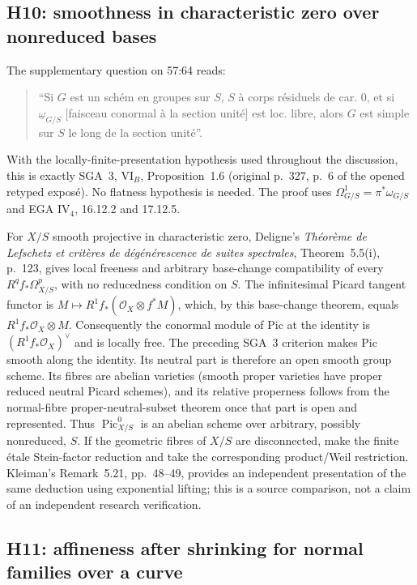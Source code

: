 \subsection{H10: smoothness in characteristic zero over nonreduced bases}

The supplementary question on 57:64 reads:
\begin{quote}
``Si $G$ est un sch\'em en groupes sur $S$, $S$ \`a corps r\'esiduels de car.
$0$, et si $\underline\omega_{G/S}$ [faisceau conormal \`a la section unit\'e]
est loc. libre, alors $G$ est simple sur $S$ le long de la section unit\'e''.
\end{quote}
With the locally-finite-presentation hypothesis used throughout the discussion,
this is exactly SGA~3, VI$_B$, Proposition~1.6 (original p.~327, p.~6 of the
opened retyped expos\'e). No flatness hypothesis is needed. The proof uses
$\Omega^1_{G/S}=\pi^*\omega_{G/S}$ and EGA IV$_4$, 16.12.2 and 17.12.5.

For $X/S$ smooth projective in characteristic zero, Deligne's
\emph{Th\'eor\`eme de Lefschetz et crit\`eres de d\'eg\'en\'erescence de suites
spectrales}, Theorem~5.5(i), p.~123, gives local freeness and arbitrary
base-change compatibility of every $R^qf_*\Omega^p_{X/S}$, with no reducedness
condition on $S$. The infinitesimal Picard tangent functor is
$M\mapsto R^1f_*(\mathcal O_X\otimes f^*M)$, which, by this base-change theorem,
equals $R^1f_*\mathcal O_X\otimes M$. Consequently the conormal module of Pic
at the identity is $(R^1f_*\mathcal O_X)^\vee$ and is locally free.
The preceding SGA~3 criterion makes Pic smooth along the identity. Its neutral
part is therefore an open smooth group scheme. Its fibres are abelian varieties
(smooth proper varieties have proper reduced neutral Picard schemes), and its
relative properness follows from the normal-fibre proper-neutral-subset theorem
once that part is open and represented. Thus $\operatorname{Pic}^0_{X/S}$ is an
abelian scheme over arbitrary, possibly nonreduced, $S$.
If the geometric fibres of $X/S$ are disconnected, make the finite \'etale
Stein-factor reduction and take the corresponding product/Weil restriction.
Kleiman's Remark~5.21, pp.~48--49, provides an independent presentation of the
same deduction using exponential lifting; this is a source comparison, not a
claim of an independent research verification.

\subsection{H11: affineness after shrinking for normal families over a curve}

